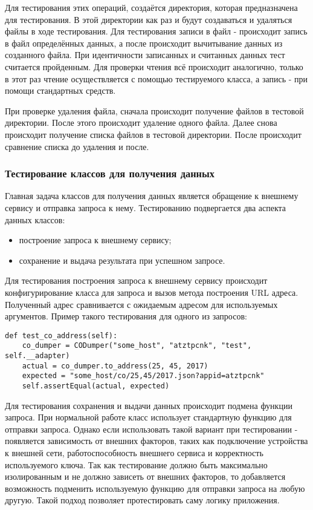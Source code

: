 Для тестирования этих операций, создаётся директория, которая предназначена для тестирования.
В этой директории как раз и будут создаваться и удаляться файлы в ходе тестирования.
Для тестирования записи в файл - происходит запись в файл определённых данных, а после происходит вычитывание данных из созданного файла.
При идентичности записанных и считанных данных тест считается пройденным.
Для проверки чтения всё происходит аналогично, только в этот раз чтение осуществляется с помощью тестируемого класса, а запись - при помощи стандартных средств.

При проверке удаления файла, сначала происходит получение файлов в тестовой директории.
После этого происходит удаление одного файла.
Далее снова происходит получение списка файлов в тестовой директории.
После происходит сравнение списка до удаления и после.

\subsubsection{Тестирование классов для получения данных}

Главная задача классов для получения данных является обращение к внешнему сервису и отправка запроса к нему.
Тестированию подвергается два аспекта данных классов:
\begin{itemize}
    \item построение запроса к внешнему сервису;
    \item сохранение и выдача результата при успешном запросе.
\end{itemize}

Для тестирования построения запроса к внешнему сервису происходит конфигурирование класса для запроса и вызов метода построения URL адреса.
Полученный адрес сравнивается с ожидаемым адресом для используемых аргументов.
Пример такого тестирования для одного из запросов:

\begin{lstlisting}
def test_co_address(self):
    co_dumper = CODumper("some_host", "atztpcnk", "test", self.__adapter)
    actual = co_dumper.to_address(25, 45, 2017)
    expected = "some_host/co/25,45/2017.json?appid=atztpcnk"
    self.assertEqual(actual, expected)
\end{lstlisting}

Для тестирования сохранения и выдачи данных происходит подмена функции запроса.
При нормальной работе класс использует стандартную функцию для отправки запроса.
Однако если использовать такой вариант при тестировании - появляется зависимость от внешних факторов, таких как подключение устройства к внешней сети, работоспособность внешнего сервиса и корректность используемого ключа.
Так как тестирование должно быть максимально изолированным и не должно зависеть от внешних факторов, то добавляется возможность подменить используемую функцию для отправки запроса на любую другую.
Такой подход позволяет протестировать саму логику приложения.

